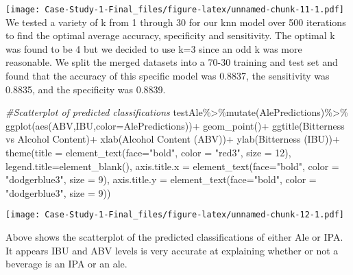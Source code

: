 \documentclass[
]{article}
\newenvironment{Shaded}{\begin{snugshade}}{\end{snugshade}}
\newcommand{\AttributeTok}[1]{\textcolor[rgb]{0.77,0.63,0.00}{#1}}
\newcommand{\CommentTok}[1]{\textcolor[rgb]{0.56,0.35,0.01}{\textit{#1}}}
\newcommand{\DecValTok}[1]{\textcolor[rgb]{0.00,0.00,0.81}{#1}}
\newcommand{\FunctionTok}[1]{\textcolor[rgb]{0.00,0.00,0.00}{#1}}
\newcommand{\NormalTok}[1]{#1}
\newcommand{\SpecialCharTok}[1]{\textcolor[rgb]{0.00,0.00,0.00}{#1}}
\newcommand{\StringTok}[1]{\textcolor[rgb]{0.31,0.60,0.02}{#1}}
\begin{document}
\texttt{[image: Case-Study-1-Final\_files/figure-latex/unnamed-chunk-11-1.pdf]}
We tested a variety of k from 1 through 30 for our knn model over 500
iterations to find the optimal average accuracy, specificity and
sensitivity. The optimal k was found to be 4 but we decided to use k=3
since an odd k was more reasonable. We split the merged datasets into a
70-30 training and test set and found that the accuracy of this specific
model was 0.8837, the sensitivity was 0.8835, and the specificity was
0.8839.

\begin{Shaded}
\begin{Highlighting}[]
\CommentTok{\#Scatterplot of predicted classifications}
\NormalTok{testAle}\SpecialCharTok{\%\textgreater{}\%}\FunctionTok{mutate}\NormalTok{(AlePredictions)}\SpecialCharTok{\%\textgreater{}\%}
  \FunctionTok{ggplot}\NormalTok{(}\FunctionTok{aes}\NormalTok{(ABV,IBU,}\AttributeTok{color=}\NormalTok{AlePredictions))}\SpecialCharTok{+}
  \FunctionTok{geom\_point}\NormalTok{()}\SpecialCharTok{+}
  \FunctionTok{ggtitle}\NormalTok{(}\StringTok{\textquotesingle{}Bitterness vs Alcohol Content\textquotesingle{}}\NormalTok{)}\SpecialCharTok{+}
  \FunctionTok{xlab}\NormalTok{(}\StringTok{\textquotesingle{}Alcohol Content (ABV)\textquotesingle{}}\NormalTok{)}\SpecialCharTok{+}
  \FunctionTok{ylab}\NormalTok{(}\StringTok{\textquotesingle{}Bitterness (IBU)\textquotesingle{}}\NormalTok{)}\SpecialCharTok{+}
  \FunctionTok{theme}\NormalTok{(}\AttributeTok{title =} \FunctionTok{element\_text}\NormalTok{(}\AttributeTok{face=}\StringTok{"bold"}\NormalTok{, }\AttributeTok{color =} \StringTok{"red3"}\NormalTok{, }\AttributeTok{size =} \DecValTok{12}\NormalTok{),}
        \AttributeTok{legend.title=}\FunctionTok{element\_blank}\NormalTok{(),}
        \AttributeTok{axis.title.x =} \FunctionTok{element\_text}\NormalTok{(}\AttributeTok{face=}\StringTok{"bold"}\NormalTok{, }\AttributeTok{color =} \StringTok{"dodgerblue3"}\NormalTok{, }\AttributeTok{size =} \DecValTok{9}\NormalTok{),}
        \AttributeTok{axis.title.y =} \FunctionTok{element\_text}\NormalTok{(}\AttributeTok{face=}\StringTok{"bold"}\NormalTok{, }\AttributeTok{color =} \StringTok{"dodgerblue3"}\NormalTok{, }\AttributeTok{size =} \DecValTok{9}\NormalTok{))}
\end{Highlighting}
\end{Shaded}

\texttt{[image: Case-Study-1-Final\_files/figure-latex/unnamed-chunk-12-1.pdf]}

Above shows the scatterplot of the predicted classifications of either
Ale or IPA. It appears IBU and ABV levels is very accurate at explaining
whether or not a beverage is an IPA or an ale.
\end{document}
